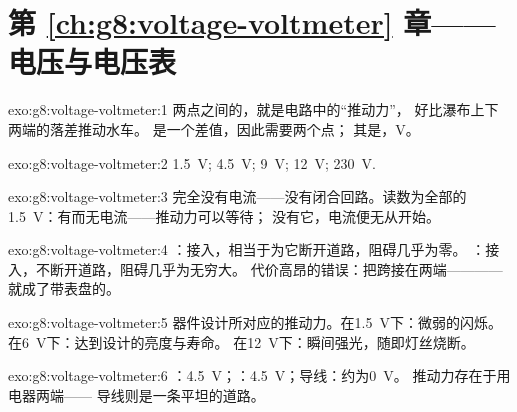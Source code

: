 \section*{第 \ref{ch:g8:voltage-voltmeter} 章——电压与电压表}

\begin{solution}{exo:g8:voltage-voltmeter:1}
两点之间的，就是电路中的“推动力”，
好比瀑布上下两端的落差推动水车。
是一个差值，因此需要两个点；
其是，\unit{V}。
\end{solution}

\begin{solution}{exo:g8:voltage-voltmeter:2}
\qty{1.5}{V}; \qty{4.5}{V}; \qty{9}{V}; \qty{12}{V};
\qty{230}{V}.
\end{solution}

\begin{solution}{exo:g8:voltage-voltmeter:3}
完全没有电流——没有闭合回路。读数为全部的
\qty{1.5}{V}：有而无电流——推动力可以等待；
没有它，电流便无从开始。
\end{solution}

\begin{solution}{exo:g8:voltage-voltmeter:4}
：接入，相当于为它断开道路，阻碍几乎为零。
：接入，不断开道路，阻碍几乎为无穷大。
代价高昂的错误：把跨接在两端————
就成了带表盘的。
\end{solution}

\begin{solution}{exo:g8:voltage-voltmeter:5}
器件设计所对应的推动力。在\qty{1.5}{V}下：微弱的闪烁。
在\qty{6}{V}下：达到设计的亮度与寿命。
在\qty{12}{V}下：瞬间强光，随即灯丝烧断。
\end{solution}

\begin{solution}{exo:g8:voltage-voltmeter:6}
：\qty{4.5}{V}；：\qty{4.5}{V}；导线：约为\qty{0}{V}。
推动力存在于用电器两端——
导线则是一条平坦的道路。
\end{solution}

